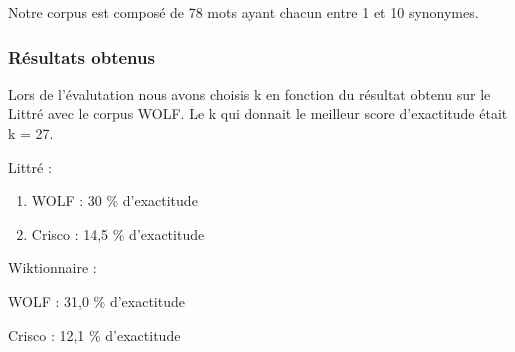 Notre corpus est composé de 78 mots ayant chacun entre 1 et 10 synonymes.

\subsubsection{Résultats obtenus}

Lors de l'évalutation nous avons choisis k en fonction du résultat obtenu sur 
le Littré avec le corpus WOLF. Le k qui donnait le meilleur score d'exactitude 
était k = 27.

\begin{enumerate}
 \item {Littré :
	\begin{enumerate}
	 \item WOLF : 30 \% d'exactitude
	 \item Crisco : 14,5 \% d'exactitude
	\end{enumerate}
	}
 \item {Wiktionnaire :
	\item WOLF : 31,0 \% d'exactitude
	\item Crisco : 12,1 \% d'exactitude
	}
\end{enumerate}

